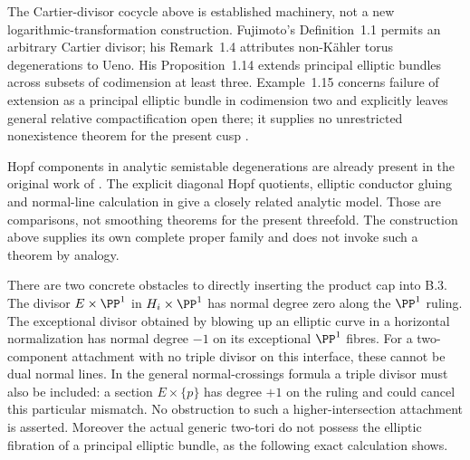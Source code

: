 \begin{remark}
The Cartier-divisor cocycle above is established machinery, not
a new logarithmic-transformation construction.  Fujimoto's
Definition~1.1 permits an arbitrary Cartier divisor; his
Remark~1.4 attributes non-K\"ahler torus degenerations to Ueno.
His Proposition~1.14 extends principal elliptic bundles across
subsets of codimension at least three.  Example~1.15 concerns
failure of extension as a principal elliptic bundle in
codimension two and explicitly leaves general relative
compactification open there; it supplies no unrestricted
nonexistence theorem for the present cusp
\citep[pp.~85--86, 93--94]{Fujimoto1990AB}.

Hopf components in analytic semistable degenerations are already
present in the original work of
\citet[Theorem 1.4 and Sections 2--3]{Nishiguchi1988IIRoot}.
The explicit diagonal Hopf quotients, elliptic conductor gluing
and normal-line calculation in
\citet[Section 3, especially Propositions 3.1--3.4]{SS00}
give a closely related analytic model.  Those are comparisons,
not smoothing theorems for the present threefold.  The construction
above supplies its own complete proper family and does not invoke
such a theorem by analogy.

There are two concrete obstacles to directly inserting the product
cap into B.3.  The divisor $E\times\PP^1$ in
$H_i\times\PP^1$ has normal degree zero along the $\PP^1$
ruling.  The exceptional divisor obtained by blowing up an
elliptic curve in a horizontal normalization has normal degree
$-1$ on its exceptional $\PP^1$ fibres.  For a two-component
attachment with no triple divisor on this interface, these cannot
be dual normal lines.  In the general normal-crossings formula
a triple divisor must also be included: a section
$E\times\{p\}$ has degree $+1$ on the ruling and could cancel
this particular mismatch.  No obstruction to such a higher-intersection
attachment is asserted.  Moreover the actual generic two-tori
do not possess the elliptic fibration of a principal elliptic
bundle, as the following exact calculation shows.


\end{remark}
